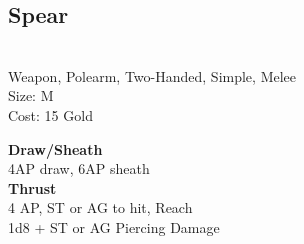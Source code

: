 \subsection{Spear}\label{weapon:spear}\\
Weapon, Polearm, Two-Handed, Simple, Melee\\
Size: M\\
Cost: 15 Gold

\textbf{Draw/Sheath}\\
4AP draw, 6AP sheath\\

\textbf{Thrust}\\
4 AP, ST or AG to hit,  Reach\\
1d8 + \texttimes ST or AG Piercing Damage

